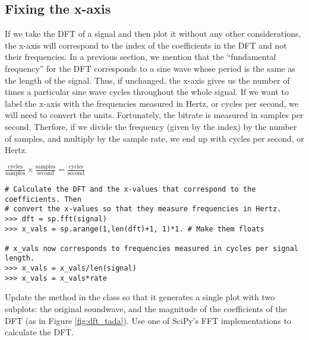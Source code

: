\subsection*{Fixing the x-axis} %

If we take the DFT of a signal and then plot it without any other considerations, the x-axis will correspond to the index of the coefficients in the DFT and not their frequencies.
In a previous section, we mention that the ``fundamental frequency'' for the DFT corresponds to a sine wave whose period is the same as the length of the signal.
Thus, if unchanged, the x-axis gives us the number of times a particular sine wave cycles throughout the whole signal.
If we want to label the x-axis with the frequencies measured in Hertz, or cycles per second, we will need to convert the units.
Fortunately, the bitrate is measured in samples per second.
Therfore, if we divide the frequency (given by the index) by the number of samples, and multiply by the sample rate, we end up with cycles per second, or Hertz.

\begin{center}
    $\frac{\mbox{cycles}}{\mbox{samples}} \times \frac{\mbox{samples}}{\mbox{second}} = \frac{\mbox{cycles}}{\mbox{second}}$
\end{center}

\begin{lstlisting}
# Calculate the DFT and the x-values that correspond to the coefficients. Then
# convert the x-values so that they measure frequencies in Hertz.
>>> dft = sp.fft(signal)
>>> x_vals = sp.arange(1,len(dft)+1, 1)*1. # Make them floats

# x_vals now corresponds to frequencies measured in cycles per signal length.
>>> x_vals = x_vals/len(signal)
>>> x_vals = x_vals*rate
\end{lstlisting}

\begin{comment} %
\begin{problem}
Modify the \li{calculate_dft()} method so that in addition to calculating the Fourier coefficients, it also returns a list of their corresponding frequencies measured in Hertz.
\end{problem}
\end{comment}

\begin{problem}
Update the  method in the  class so that it generates a single plot with two subplots: the original soundwave, and the magnitude of the coefficients of the DFT (as in Figure \ref{fig:dft_tada}).
Use one of SciPy's FFT implementations to calculate the DFT.
\end{problem}

